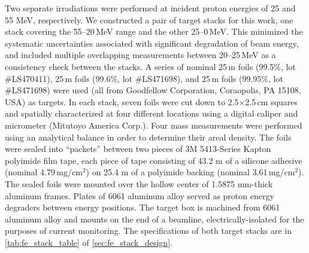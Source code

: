 Two separate irradiations were performed at incident proton energies of 25 and 55 MeV, respectively.
We constructed a pair of target stacks 
for this work,
one stack covering the 55--20\,MeV range and the other  25--0\,MeV.
This minimized the systematic uncertainties associated with significant degradation of beam energy, and
included multiple overlapping measurements between 20--25\,MeV as a consistency check between the stacks.
A series of nominal 25\,\mmicro m  foils (99.5\%, lot \#LS470411), 25\,\mmicro m  foils (99.6\%, lot \#LS471698), and 25\,\mmicro m  foils (99.95\%, lot \#LS471698) were used (all from Goodfellow Corporation, Coraopolis, PA 15108, USA) as targets.
In each stack, seven foils 
were cut down to 2.5$\times$2.5\,cm squares and spatially characterized 
at four different locations using a digital caliper and micrometer (Mitutoyo America Corp.).
Four mass measurements were performed using an analytical balance 
in order to determine their areal density. 
The foils were  sealed into \enquote{packets} between two pieces of  3M 5413-Series Kapton polyimide film tape,  
each piece of tape 
consisting of 43.2 \mmicro m of a silicone adhesive (nominal 4.79\,mg/cm$^2$) on 25.4 \mmicro m of a polyimide backing (nominal 3.61\,mg/cm$^2$).
The sealed foils were mounted over the hollow center of  1.5875 mm-thick aluminum frames.
Plates of 6061 aluminum alloy  served as proton energy degraders  between energy positions.
The target box
is machined from 6061 aluminum alloy and mounts on the end of a beamline,  electrically-isolated  for the purposes of current monitoring.
The specifications of both target stacks 
are in \autoref{tab:fe_stack_table} of 
\ref{sec:fe_stack_design}.




